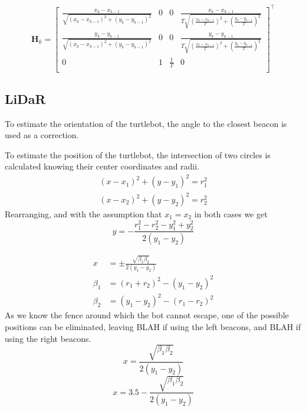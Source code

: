 \documentclass{ieeeaccess}
\begin{document}
	\begin{equation}
	\label{eq:Hsys}
		\boldsymbol{H}_{k}	=
		\begin{bmatrix}
			\frac{x_{k}-x_{k-1}}{\sqrt{\left( x_{k} - x_{k-1} \right)^{2}+\left( y_{k} - y_{k-1} \right)^{2}}}	&0	&0		&\frac{x_{k}-x_{k-1}}{T\sqrt{\left(\frac{x_{k} - x_{k-1}}{T}\right)^{2}+\left(\frac{y_{k} - y_{k-1}}{T}\right)^{2}}}	\\
			\frac{y_{k}-y_{k-1}}{\sqrt{\left( x_{k} - x_{k-1} \right)^{2}+\left( y_{k} - y_{k-1} \right)^{2}}}	&0	&0		&\frac{y_{k}-y_{k-1}}{T\sqrt{\left(\frac{x_{k} - x_{k-1}}{T}\right)^{2}+\left(\frac{y_{k} - y_{k-1}}{T}\right)^{2}}}	\\
			0															&1	&\frac{1}{T}	&0																				\\
			
		\end{bmatrix}^{\top}
	\end{equation}

\subsection{LiDaR}
	To estimate the orientation of the turtlebot, the angle to the closest beacon is used as a correction.
	
	To estimate the position of the turtlebot, the intersection of two circles is calculated knowing their center coordinates and radii.
	\begin{equation}
	\begin{aligned}
		\left(x-x_{1}\right)^{2} + \left(y-y_{1}\right)^{2}=r_{1}^{2}	\\
		\left(x-x_{2}\right)^{2} + \left(y-y_{2}\right)^{2}=r_{2}^{2}
	\end{aligned}
	\end{equation}
	Rearranging, and with the assumption that $x_{1}=x_{2}$  in both cases we get
	\begin{equation}
		y = -\frac{r_{1}^{2}-r_{2}^{2}-y_{1}^{2}+y_{2}^{2}}{2\left(y_{1}-y_{2}\right)}
	\end{equation}
	
	\begin{equation}
	\begin{aligned}
		x 		&= \pm \frac{\sqrt{\beta_{1}\beta_{2}}}{2\left(y_{1}-y_{2}\right)}	\\
		\beta_{1} 	&= \left(r_{1}+r_{2}\right)^{2}-\left(y_{1}-y_{2}\right)^{2}		\\
		\beta_{2} 	&=\left(y_{1}-y_{2}\right)^{2}-\left(r_{1}-r_{2}\right)^{2}
	\end{aligned}
	\end{equation}
	As we know the fence around which the bot cannot escape, one of the possible positions can be eliminated, leaving BLAH if using the left beacons, and BLAH if using the right beacons.
	\begin{equation}
		x 		= \frac{\sqrt{\beta_{1}\beta_{2}}}{2\left(y_{1}-y_{2}\right)}
	\end{equation}
	\begin{equation}
		x 		= 3.5-\frac{\sqrt{\beta_{1}\beta_{2}}}{2\left(y_{1}-y_{2}\right)}
	\end{equation}
	
\end{document}
